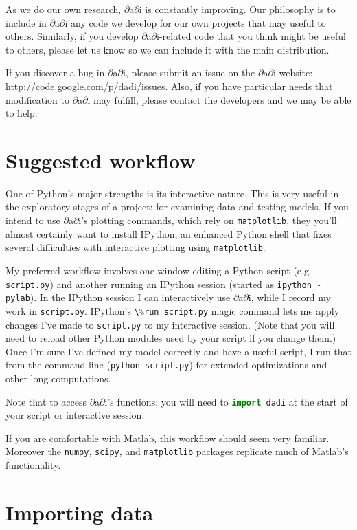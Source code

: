 \documentclass[12pt]{article}
\makeatletter
\newcommand{\dadi}{$\partial$a$\partial$i\xspace}
\newcommand{\py}[1]{\lstinline[language=Python, showstringspaces=False]@#1@}
\makeatother
\begin{document}
As we do our own research, \dadi is constantly improving.
Our philosophy is to include in \dadi any code we develop for our own projects that may useful to others.
Similarly, if you develop \dadi-related code that you think might be useful to others, please let us know so we can include it with the main distribution.

If you discover a bug in \dadi, please submit an issue on the \dadi website: \url{http://code.google.com/p/dadi/issues}.
Also, if you have particular needs that modification to \dadi may fulfill, please contact the developers and we may be able to help.

\section{Suggested workflow}

One of Python's major strengths is its interactive nature.
This is very useful in the exploratory stages of a project: for examining data and testing models.
If you intend to use \dadi's plotting commands, which rely on \py{matplotlib}, they you'll almost certainly want to install IPython, an enhanced Python shell that fixes several difficulties with interactive plotting using \py{matplotlib}.

My preferred workflow involves one window editing a Python script (e.g. \py{script.py}) and another running an IPython session (started as \py{ipython -pylab}).
In the IPython session I can interactively use \dadi, while I record my work in \py{script.py}.
IPython's \py{\%run script.py} magic command lets me apply changes I've made to \py{script.py} to my interactive session. 
(Note that you will need to reload other Python modules used by your script if you change them.)
Once I'm sure I've defined my model correctly and have a useful script, I run that from the command line (\py{python script.py}) for extended optimizations and other long computations.

Note that to access \dadi's functions, you will need to \py{import dadi} at the start of your script or interactive session.

If you are comfortable with Matlab, this workflow should seem very familiar.
Moreover the \py{numpy}, \py{scipy}, and \py{matplotlib} packages replicate much of Matlab's functionality.

\section{Importing data}
\end{document}
